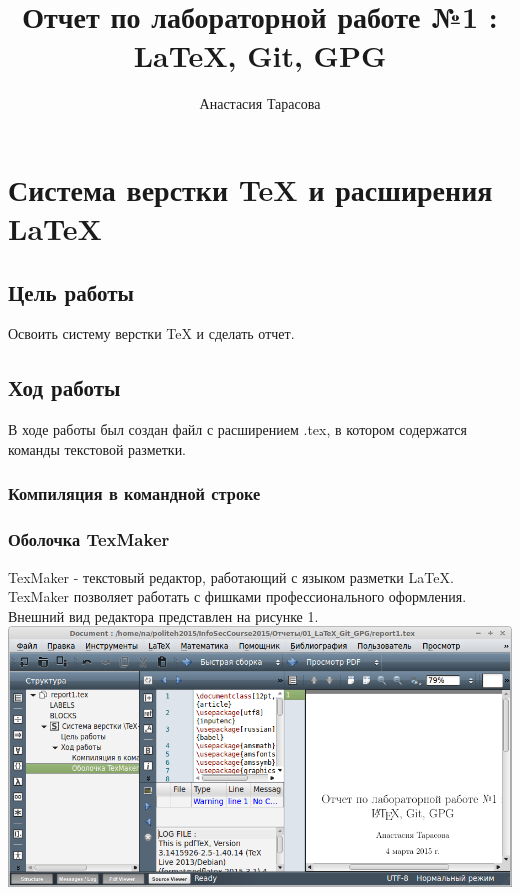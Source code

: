 \documentclass[12pt,a4paper]{article}
\author{Анастасия Тарасова}
\title{Отчет по лабораторной работе №1 :\\ \LaTeX{}, Git, GPG}
\begin{document}
\maketitle
\section{Система верстки \TeX{} и расширения \LaTeX{}}
\subsection{Цель работы}
Освоить систему верстки \TeX{} и сделать отчет.
\subsection{Ход работы}
В ходе работы был создан файл с расширением .tex, в котором содержатся команды текстовой разметки.
\subsubsection{Компиляция в командной строке}
\subsubsection{Оболочка TexMaker}
TexMaker - текстовый редактор, работающий с языком разметки LaTeX. TexMaker позволяет работать с фишками профессионального оформления. Внешний вид редактора представлен на рисунке 1.
\\
\includegraphics[scale=0.4]{res/texmaker}
\end{document}

